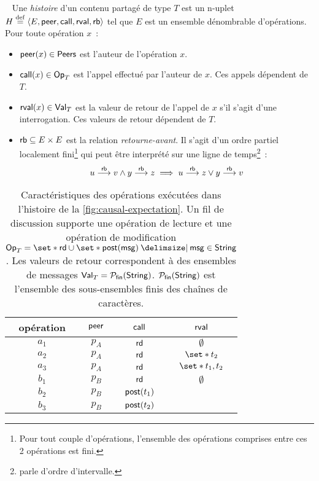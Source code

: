 \begin{definition}[histoire]\label{def:history}~\autocite{burckhardt_eventualconsistency_2014}
Une \emph{histoire} d'un contenu partagé de type $T$ est un n-uplet $H \defeq \tuple*{E, \trm{peer}, \trm{call}, \trm{rval}, \trm{rb}}$ tel que $E$ est un ensemble dénombrable d'opérations.
Pour toute opération $x$~:
\begin{itemize}
\item $\trm{peer}(x) \in \trm{Peers}$ est l'auteur de l'opération $x$.
\item $\trm{call}(x) \in \trm{Op}_T$ est l'appel effectué par l'auteur de $x$.
Ces appels dépendent de $T$.
\item $\trm{rval}(x) \in \trm{Val}_T$ est la valeur de retour de l'appel de $x$ s'il s'agit d'une interrogation.
Ces valeurs de retour dépendent de $T$.
\end{itemize}
\begin{itemize}[leftmargin=*]
\item[] $\trm{rb} \subseteq E \times E$ est la relation \emph{retourne-avant}.
Il s'agit d'un ordre partiel localement fini\footnote{Pour tout couple d'opérations, l'ensemble des opérations comprises entre ces 2 opérations est fini.} qui peut être interprété sur une ligne de temps\footnote{\textcite{greenough_1976_semiorder} parle d'ordre d'intervalle.}~:
\begin{equation*}
    u \rb v \land y \rb z \implies u \rb z \lor y \rb v
\end{equation*}
\end{itemize}
\end{definition}

\begin{table}[ht]
    \centering
    \begin{tabular}{cccc}
        opération & $\trm{peer}$ & $\trm{call}$ & $\trm{rval}$ \\
        \toprule
        $a_1$ & $p_A$ & $\trm{rd}$ & $\emptyset$ \\
        $a_2$ & $p_A$ & $\trm{rd}$ & $\set*{t_2}$ \\
        $a_3$ & $p_A$ & $\trm{rd}$ & $\set*{t_1, t_2}$ \\
        $b_1$ & $p_B$ & $\trm{rd}$ & $\emptyset$ \\
        $b_2$ & $p_B$ & $\trm{post}(t_1)$ & \\
        $b_3$ & $p_B$ & $\trm{post}(t_2)$ & \\
    \end{tabular}
    \caption[Caractéristiques des opérations exécutées dans l'histoire de la \autoref{fig:causal-expectation}]{Caractéristiques des opérations exécutées dans l'histoire de la \autoref{fig:causal-expectation}.
    Un fil de discussion supporte une opération de lecture et une opération de modification $\trm{Op}_T = \set*{\trm{rd}} \cup \set*{\trm{post}(\trm{msg}) \given \trm{msg} \in \trm{String}}$.
    Les valeurs de retour correspondent à des ensembles de messages $\trm{Val}_T = \powerfset{\trm{String}}$. $\powerfset{\trm{String}}$ est l'ensemble des sous-ensembles finis des chaînes de caractères.}\label{tab:op-attributes}
\end{table}

